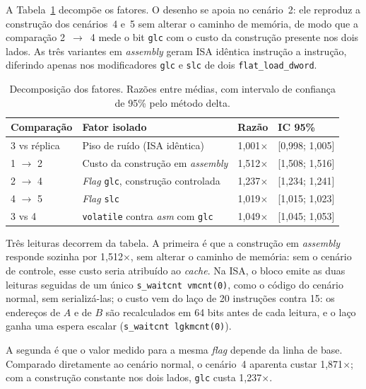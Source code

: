 \documentclass[12pt]{article}
\begin{document}
A Tabela~\ref{tab:razoes} decompõe os fatores. O desenho se apoia no cenário~2: ele reproduz a construção dos cenários~4 e~5 sem alterar o caminho de memória, de modo que a comparação 2~$\to$~4 mede o bit \texttt{glc} com o custo da construção presente nos dois lados. As três variantes em \textit{assembly} geram ISA idêntica instrução a instrução, diferindo apenas nos modificadores \texttt{glc} e \texttt{slc} de dois \texttt{flat\_load\_dword}.

\begin{table}[ht]
\centering
\caption{Decomposição dos fatores. Razões entre médias, com intervalo de confiança de 95\% pelo método delta.}
\label{tab:razoes}
\footnotesize
\begin{tabular}{@{}llrl@{}}
\toprule
\textbf{Comparação} & \textbf{Fator isolado} & \textbf{Razão} & \textbf{IC 95\%} \\
\midrule
3 vs réplica & Piso de ruído (ISA idêntica) & 1,001$\times$ & [0,998; 1,005] \\
1 $\to$ 2 & Custo da construção em \textit{assembly} & 1,512$\times$ & [1,508; 1,516] \\
2 $\to$ 4 & \textit{Flag} \texttt{glc}, construção controlada & 1,237$\times$ & [1,234; 1,241] \\
4 $\to$ 5 & \textit{Flag} \texttt{slc} & 1,019$\times$ & [1,015; 1,023] \\
3 vs 4 & \texttt{volatile} contra \textit{asm} com \texttt{glc} & 1,049$\times$ & [1,045; 1,053] \\
\bottomrule
\end{tabular}
\end{table}

Três leituras decorrem da tabela. A primeira é que a construção em \textit{assembly} responde sozinha por 1,512$\times$, sem alterar o caminho de memória: sem o cenário de controle, esse custo seria atribuído ao \textit{cache}. Na ISA, o bloco emite as duas leituras seguidas de um único \texttt{s\_waitcnt vmcnt(0)}, como o código do cenário normal, sem serializá-las; o custo vem do laço de 20 instruções contra 15: os endereços de $A$ e de $B$ são recalculados em 64 bits antes de cada leitura, e o laço ganha uma espera escalar (\texttt{s\_waitcnt lgkmcnt(0)}).

A segunda é que o valor medido para a mesma \textit{flag} depende da linha de base. Comparado diretamente ao cenário normal, o cenário~4 aparenta custar 1,871$\times$; com a construção constante nos dois lados, \texttt{glc} custa 1,237$\times$.
\end{document}
